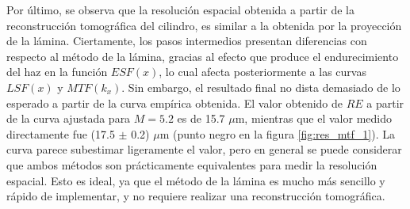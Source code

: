 Por último, se observa que la resolución espacial obtenida a partir de la reconstrucción tomográfica
del cilindro, es similar a la obtenida por la proyección de la lámina. Ciertamente, los pasos intermedios
presentan diferencias con respecto al método de la lámina, gracias al efecto que produce el endurecimiento
del haz en la función $ESF(x)$, lo cual afecta posteriormente a las curvas $LSF(x)$ y $MTF(k_x)$.
Sin embargo, el resultado final no dista demasiado de lo esperado a partir de la curva empírica obtenida.
El valor obtenido de $RE$
a partir de la curva ajustada para $M=5.2$ es de 15.7 $\mu$m, mientras que el valor medido directamente fue
(17.5 $\pm$ 0.2) $\mu$m (punto negro en la figura \ref{fig:res_mtf_1}). La curva parece subestimar ligeramente el valor, pero en general se puede
considerar que ambos métodos son prácticamente equivalentes para medir la resolución espacial. Esto
es ideal, ya que el método de la lámina es mucho más sencillo y rápido de implementar, y no requiere
realizar una reconstrucción tomográfica. 